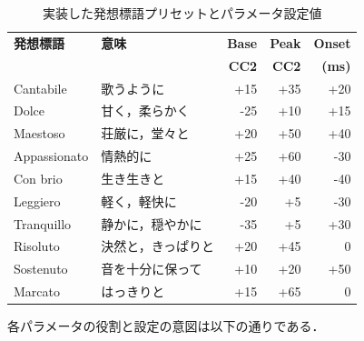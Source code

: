 \begin{table}[tb]
	\centering
	\caption{実装した発想標語プリセットとパラメータ設定値}
	\label{tab:table1}
	\begin{tabular}{l|l|r|r|r} \hline
		\textbf{発想標語} & \textbf{意味} & \textbf{Base} & \textbf{Peak} & \textbf{Onset} \\
		              &             & \textbf{CC2}  & \textbf{CC2}  & \textbf{(ms)}  \\ \hline \hline
		Cantabile     & 歌うように       & +15           & +35           & +20            \\
		Dolce         & 甘く，柔らかく     & -25           & +10           & +15            \\
		Maestoso      & 荘厳に，堂々と     & +20           & +50           & +40            \\
		Appassionato  & 情熱的に        & +25           & +60           & -30            \\
		Con brio      & 生き生きと       & +15           & +40           & -40            \\
		Leggiero      & 軽く，軽快に      & -20           & +5            & -30            \\
		Tranquillo    & 静かに，穏やかに    & -35           & +5            & +30            \\
		Risoluto      & 決然と，きっぱりと   & +20           & +45           & 0              \\
		Sostenuto     & 音を十分に保って    & +10           & +20           & +50            \\
		Marcato       & はっきりと       & +15           & +65           & 0              \\ \hline
	\end{tabular}
\end{table}

各パラメータの役割と設定の意図は以下の通りである．

